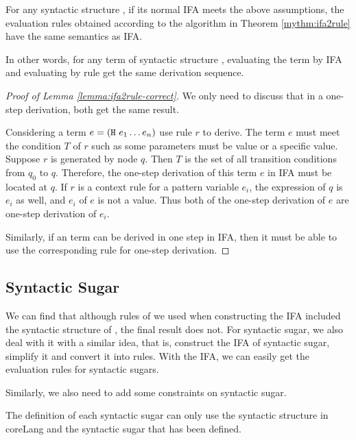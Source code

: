 \begin{lemma}
\label{lemma:ifa2rule-correct}
For any syntactic structure , if its normal IFA meets the above assumptions, the evaluation rules obtained according to the algorithm in Theorem \ref{mythm:ifa2rule} have the same semantics as IFA.
\end{lemma}

In other words, for any term of syntactic structure , evaluating the term by IFA and evaluating by rule get the same derivation sequence.

\begin{proof}[Proof of Lemma \ref{lemma:ifa2rule-correct}]
We only need to discuss that in a one-step derivation, both get the same result.

Considering a term $e=(\mbox{\tt H}~e_1 \ldots e_n)$ use rule $r$ to derive. The term $e$ must meet the condition $T$ of $r$ such as some parameters must be value or a specific value. Suppose $r$ is generated by node $q$. Then $T$ is the set of all transition conditions from $q_0$ to $q$. Therefore, the one-step derivation of this term $e$ in IFA must be located at $q$. If $r$ is a context rule for a pattern variable $e_i$, the expression of $q$ is $e_i$ as well, and $e_i$ of $e$ is not a value. Thus both of the one-step derivation of $e$ are one-step derivation of $e_i$.

Similarly, if an term can be derived in one step in IFA, then it must be able to use the corresponding rule for one-step derivation.

\end{proof}

\subsection{Syntactic Sugar}

We can find that although rules of  we used when constructing the IFA included the syntactic structure of , the final result does not. For syntactic sugar, we also deal with it with a similar idea, that is, construct the IFA of syntactic sugar, simplify it and convert it into rules. With the IFA, we can easily get the evaluation rules for syntactic sugars.

Similarly, we also need to add some constraints on syntactic sugar.

\begin{Asm}
\label{Asm:orderliness-sugar}
The definition of each syntactic sugar can only use the syntactic structure in coreLang and the syntactic sugar that has been defined.
\end{Asm}

